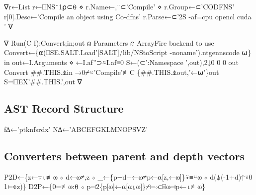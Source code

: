 \documentclass{article}%
\begin{document}
∇r←List
 r←⎕NS¨1⍴⊂⍬ ⋄ r.Name←,¨⊂'Compile' ⋄ r.Group←⊂'CODFNS'
 r[0].Desc←'Compile an object using Co-dfns'
 r.Parse←⊂'2S -af=cpu opencl cuda '
∇

∇ Run(C I);Convert;in;out
⍝ Parameters
⍝              ArrayFire backend to use
 Convert←\{⍺(⎕SE.SALT.Load'[SALT]/lib/NStoScript -noname').ntgennscode ⍵\}
 in out←I.Arguments ⋄ ←I.af''⊃⍨I.af≡0
 S←(⊂':Namespace ',out),2↓0 0 0 out Convert ##.THIS.⍎in
 →0⌿⍨'Compile'≢C
 \{##.THIS.⍎out,'←⍵'\}out  S⊣⎕EX'##.THIS.',out
∇
\nwendcode{}\nwdocspar

\subsection{AST Record Structure}

\nwenddocs{}\endmoddef\nwstartdeflinemarkup{}\nwenddeflinemarkup
f∆←'ptknfsrdx'
N∆←'ABCEFGKLMNOPSVZ'
\nwendcode{}\nwdocspar

\subsection{Converters between parent and depth vectors}

\nwenddocs{}\endmoddef\nwstartdeflinemarkup{}\nwenddeflinemarkup
P2D←\{z←⍪⍳≢⍵ ⋄ d←⍵≠,z ⋄ _←\{p⊣d+←⍵≠p←⍺[z,←⍵]\}⍣≡⍨⍵ ⋄ d(⍋(-1+d)↑⍤0 1⊢⌽z)\}
D2P←\{0=≢⍵:⍬ ⋄ p⊣2\{p[⍵]←⍺[⍺⍸⍵]\}⌿⊢∘⊂⌸⍵⊣p←⍳≢⍵\}
\nwendcode{}\nwdocspar
\end{document}

